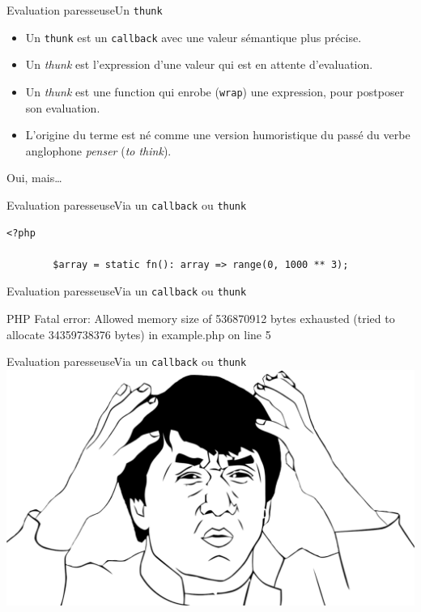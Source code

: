 \begin{frame}{Evaluation paresseuse}{Un \texttt{thunk}}
    \begin{itemize}[<+->]
        \item Un \texttt{thunk} est un \texttt{callback} avec une valeur
        sémantique plus précise.
        \item Un \textit{thunk} est l'expression d'une valeur qui est en attente
        d'evaluation.
        \item Un \textit{thunk} est une function qui enrobe (\texttt{wrap}) une
        expression, pour postposer son evaluation.
        \item L'origine du terme est né comme une version humoristique du passé
        du verbe anglophone \textit{penser} (\textit{to think}).
    \end{itemize}
\end{frame}

\begin{frameC}{Oui, mais\ldots}

\end{frameC}

\begin{frame}[fragile]{Evaluation paresseuse}{Via un \texttt{callback} ou \texttt{thunk}}
    \begin{lstlisting}[firstnumber=1]
        <?php

        $array = static fn(): array => range(0, 1000 ** 3);
    \end{lstlisting}
\end{frame}

\begin{frame}[fragile]{Evaluation paresseuse}{Via un \texttt{callback} ou \texttt{thunk}}
    \begin{spverbatim}
        PHP Fatal error: Allowed memory size of 536870912 bytes exhausted (tried to allocate 34359738376 bytes) in example.php on line 5
    \end{spverbatim}
\end{frame}

\begin{frame}[fragile]{Evaluation paresseuse}{Via un \texttt{callback} ou \texttt{thunk}}
    \includegraphics[width=\textwidth]{meme/wtf.png}
\end{frame}

